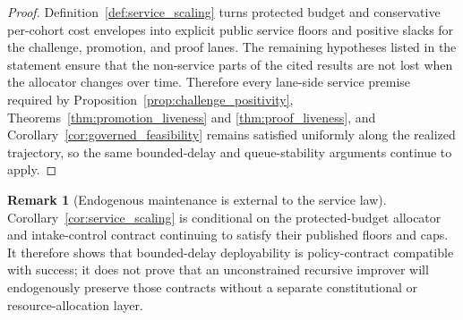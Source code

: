 \documentclass[11pt]{article}
\theoremstyle{definition}
\newtheorem{remark}[theorem]{Remark}
\newcommand{\1}{\mathbf{1}}
\begin{document}
\begin{proof}
Definition~\ref{def:service_scaling} turns protected budget and conservative per-cohort cost envelopes into explicit public service floors and positive slacks for the challenge, promotion, and proof lanes. The remaining hypotheses listed in the statement ensure that the non-service parts of the cited results are not lost when the allocator changes over time. Therefore every lane-side service premise required by Proposition~\ref{prop:challenge_positivity}, Theorems~\ref{thm:promotion_liveness} and \ref{thm:proof_liveness}, and Corollary~\ref{cor:governed_feasibility} remains satisfied uniformly along the realized trajectory, so the same bounded-delay and queue-stability arguments continue to apply.
\end{proof}

\begin{remark}[Endogenous maintenance is external to the service law]
Corollary~\ref{cor:service_scaling} is conditional on the protected-budget allocator and intake-control contract continuing to satisfy their published floors and caps. It therefore shows that bounded-delay deployability is policy-contract compatible with success; it does not prove that an unconstrained recursive improver will endogenously preserve those contracts without a separate constitutional or resource-allocation layer.
\end{remark}
\end{document}
